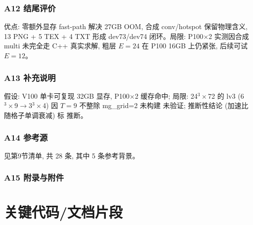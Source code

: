 \documentclass[UTF8]{ctexart}
\begin{document}
\subsubsection{A12 结尾评价}
优点: 零额外显存 fast-path 解决 27GB OOM, 合成 conv/hotspot 保留物理含义, 13 PNG + 5 TEX + 4 TXT 形成 dev73/dev74 闭环。局限: P100$\times$2 实测因合成 multi 未完全走 C++ 真实求解, 粗层 $E=24$ 在 P100 16GB 上仍紧张, 后续可试 $E=12$。

\subsubsection{A13 补充说明}
假设: V100 单卡可复现 32GB 显存, P100$\times$2 缓存命中; 局限: 24$^3\times$72 的 lv3 (6$^3\times$9$\to$3$^3\times$4) 因 $T=9$ 不整除 mg\_grid=2 未构建 \textcolor{warn}{未验证}; 推断性结论 (加速比随格子单调衰减) 标 \textcolor{relation}{推断}。

\subsubsection{A14 参考源}
见第9节清单, 共 28 条, 其中 5 条参考背景。

\subsubsection{A15 附录与附件}



\section{关键代码/文档片段}




\end{document}
